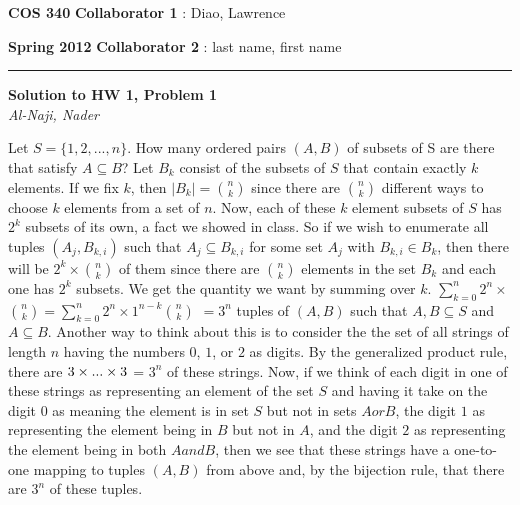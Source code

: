 \documentclass[12pt]{article}
\newcommand{\myheader}[4]
{\vspace*{-0.5in}
\noindent
{#1} \hfill {#3}

\noindent
{#2} \hfill {#4}

\noindent
\rule[8pt]{\textwidth}{1pt}

\vspace{1ex} 
}  %
\newcommand{\myalgsheader}[0]
{\myheader
{ {\bf{COS 340}} }
{ {\bf{Spring 2012}} }
{ {\bf{Collaborator 1}} : Diao, Lawrence }
{ {\bf{Collaborator 2}} : last name, first name}
}
\newcommand{\myhwtitle}[3]
{\begin{center}
{\large {\bf Solution to HW {#1}, Problem {#2}}}\\
\medskip 
{\it {#3}} %
\end{center}}
\begin{document}
\myalgsheader

\pagestyle{plain}

\myhwtitle{1}{1}{Al-Naji, Nader}

\bigskip

Let $S = \{1,2, ...,n\}$. How many ordered pairs $(A,B)$ of subsets of S are there that satisfy $A \subseteq B$?
\newline
\newline
Let $B_k$ consist of the subsets of $S$ that contain exactly $k$ elements. If we fix $k$, then $|B_k| = $$n \choose k$ since there are
$n \choose k$ different ways to choose $k$ elements from a set of $n$. Now, each of these $k$ element subsets of $S$ has $2^k$ subsets of its
own, a fact we showed in class. So if we wish to enumerate all tuples $(A_{j}, B_{k,i})$ such that $A_{j} \subseteq B_{k,i}$ for some set $A_j$ with $B_{k,i} \in B_k$, then
there will be $2^k \times $$n \choose k$ of them since there are $n \choose k$ elements in the set $B_k$ and each one has
$2^k$ subsets. We get the quantity we want by summing over $k$. $\sum_{k=0}^n 2^n \times $$n \choose k$$ = $$\sum_{k=0}^n 2^n \times 1^{n-k} $$n \choose k$
$ = $$3^n$ tuples of $(A,B)$ such that $A, B \subseteq S$ and $A \subseteq B$.
\newline
\newline
Another way to think about this is to consider the the set of all strings of length $n$ having the numbers $0$, $1$, or $2$ as digits. By the 
generalized product rule, there are $3 \time 3 \times ... \times 3$ = $3^n$ of these strings. Now, if we think of each digit in one of these
strings as representing an element of the set $S$ and having it take on the digit $0$ as meaning the element is in set $S$ but not in
sets $A or B$, the digit $1$ as representing the element being in $B$ but not in $A$, and the digit $2$ as representing the element being
in both $A and B$, then we see that these strings have a one-to-one mapping to tuples $(A, B)$ from above and, by the bijection rule,
that there are $3^n$ of these tuples.
\end{document}
